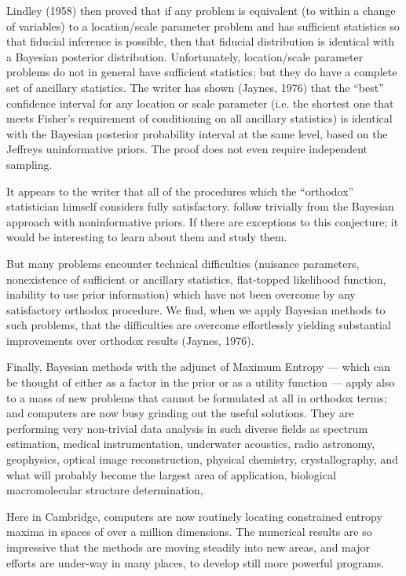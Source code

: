 \documentclass[12pt]{article}
\begin{document}
Lindley (1958) then proved that if any problem is equivalent (to within a change of variables) to a location/scale parameter problem and has sufficient statistics so that fiducial inference is possible, then that fiducial distribution is identical with a Bayesian posterior distribution.
Unfortunately, location/scale parameter problems do not in general have sufficient statistics; but they do have a complete set of ancillary statistics. The writer has shown (Jaynes, 1976) that the ``best'' confidence interval for any location or scale parameter (i.e. the shortest one that meets Fisher's
requirement of conditioning on all ancillary statistics) is
identical with the Bayesian posterior probability interval at
the same level, based on the Jeffreys uninformative priors. The
proof does not even require independent sampling.

It appears to the writer that all of the procedures which
the ``orthodox'' statistician himself considers fully
satisfactory. follow trivially from the Bayesian approach with
noninformative priors. If there are exceptions to this
conjecture; it would be interesting to learn about them and
study them.

But many problems encounter technical difficulties
(nuisance parameters, nonexistence of sufficient or ancillary
statistics, flat-topped likelihood function, inability to use
prior information) which have not been overcome by any
satisfactory orthodox procedure. We find, when we apply
Bayesian methods to such problems, that the difficulties are
overcome effortlessly yielding substantial improvements over
orthodox results (Jaynes, 1976).

Finally, Bayesian methods with the adjunct of Maximum
Entropy --- which can be thought of either as a factor in the
prior or as a utility function --- apply also to a mass of new
problems that cannot be formulated at all in orthodox terms;
and computers are now busy grinding out the useful solutions.
They are performing very non-trivial data analysis in such
diverse fields as spectrum estimation, medical instrumentation,
underwater acoustics, radio astronomy, geophysics, optical
image reconstruction, physical chemistry, crystallography, and
what will probably become the largest area of application,
biological macromolecular structure determination,

Here in Cambridge, computers are now routinely locating
constrained entropy maxima in spaces of over a million
dimensions. The numerical results are so impressive that the
methods are moving steadily into new areas, and major efforts
are under-way in many places, to develop still more powerful
programs.
\end{document}
